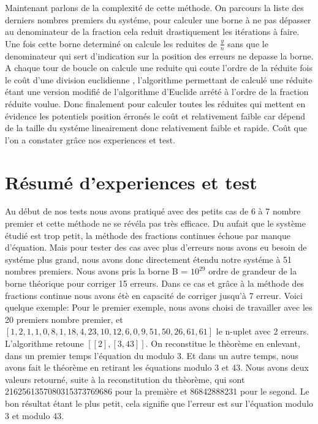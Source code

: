 \documentclass[a4paper, 11pt]{report}
\begin{document}
Maintenant parlons de la complexité de cette méthode. 
On parcours la liste des derniers nombres premiers du systéme, pour calculer une borne à ne pas dépasser au denominateur de la fraction cela reduit drastiquement les itérations à faire.
Une fois cette borne determiné on calcule les reduites de  $\frac{y}{n}$ sans que le denominateur qui sert d'indication sur la position des erreurs ne depasse la borne.
A chaque tour de boucle on calcule une reduite qui coute l'ordre de la réduite fois le coût d'une division euclidienne  ,
l'algorithme permettant de calculé une réduite étant une version modifié de l'algorithme d'Euclide arrété à l'ordre de la fraction réduite voulue.
Donc finalement pour calculer toutes les réduites qui mettent en évidence les potentiels position érronés le coût et relativement faible car dépend de la taille du systéme lineairement donc relativement faible et rapide.
Coût que l'on a constater grâce  nos experiences et test. \newline





\newpage
\section{Résumé d'experiences et test}
Au début de nos tests nous avons pratiqué avec des petits cas de 6 à 7 nombre premier et cette méthode ne se révéla pas très efficace. Du aufait que le système étudié est trop petit, la méthode des fractions continues échoue par manque d'équation.
Mais pour tester des cas avec plus d'erreurs nous avons eu besoin de systéme plus grand, nous avons donc directement étendu notre systéme à 51 nombres premiers.
Nous avons pris la borne B = $10^{29}$ ordre de grandeur de la borne théorique pour corriger 15 erreurs.
Dans ce cas et grâce à la méthode des fractions continue nous avons étè en capacité de corriger jusqu'à 7 erreur. \newline
Voici quelque exemple: \newline 
Pour le premier exemple, nous avons choisi de travailler avec les 20 premiers nombre premier, et $[1, 2, 1, 1, 0, 8, 1, 18, 4, 23, 10, 12, 6, 0, 9, 51, 50, 26, 61, 61]$ le n-uplet avec 2 erreurs.
L'algorithme retoune $[[2], [3, 43]]$. On reconstitue le thèorème en enlevant, dans un premier temps l'équation du modulo 3. Et dans un autre temps, nous avons fait le théorème en retirant 
les équations modulo 3 et 43. Nous avons deux valeurs retourné, suite à la reconstitution du thèorème, qui sont 2162561357080315373769686 pour la première et 86842888231 pour le segond. Le bon résultat étant le plus petit, cela 
signifie que l'erreur est sur l'équation modulo 3 et modulo 43. \newline
\newline
\end{document}
